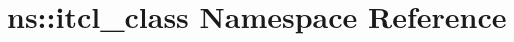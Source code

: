 \hypertarget{namespacens_1_1itcl__class}{}\section{ns\+::itcl\+\_\+class Namespace Reference}
\label{namespacens_1_1itcl__class}
